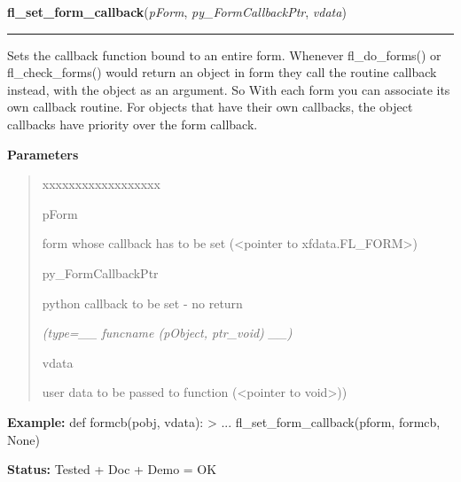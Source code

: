 \hspace{.8\funcindent}\begin{boxedminipage}{\funcwidth}

    \raggedright \textbf{fl\_set\_form\_callback}(\textit{pForm}, \textit{py\_FormCallbackPtr}, \textit{vdata})

    \vspace{-1.5ex}

    \rule{\textwidth}{0.5\fboxrule}
\setlength{\parskip}{2ex}
    Sets the callback function bound to an entire form. Whenever 
    fl\_do\_forms() or fl\_check\_forms() would return an object in form 
    they call the routine callback instead, with the object as an argument.
    So With each form you can associate its own callback routine. For 
    objects that have their own callbacks, the object callbacks have 
    priority over the form callback.

\setlength{\parskip}{1ex}
      \textbf{Parameters}
      \vspace{-1ex}

      \begin{quote}
        \begin{Ventry}{xxxxxxxxxxxxxxxxxx}

          \item[pForm]

          form whose callback has to be set ({\textless}pointer to 
          xfdata.FL\_FORM{\textgreater})

          \item[py\_FormCallbackPtr]

          python callback to be set - no return

            {\it (type=\_\_ funcname (pObject, ptr\_void) \_\_)}

          \item[vdata]

          user data to be passed to function ({\textless}pointer to 
          void{\textgreater}))

        \end{Ventry}

      \end{quote}

\textbf{Example:} def formcb(pobj, vdata): {\textgreater} ... fl\_set\_form\_callback(pform, 
formcb, None)



\textbf{Status:} Tested + Doc + Demo = OK



    \end{boxedminipage}

